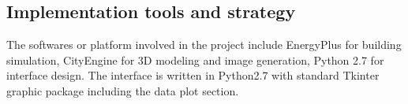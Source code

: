 \documentclass[hidelinks,12pt]{article}
\begin{document}
\subsection {Implementation tools and strategy}
The softwares or platform involved in the project include EnergyPlus
for building simulation, CityEngine for 3D modeling and image
generation, Python 2.7 for interface design. The interface is written
in Python2.7 with standard Tkinter graphic package including the data
plot section.
\begin{comment}
\item Conclusion
  \begin{enumerate}[label*=\arabic*.]
  \item Summary of the current approach in implementing the dynamic
    Energy Map
  \item Limitations of the current implementation
    \begin{enumerate}[label*=\arabic*.]
    \item Simplified building simulation assumption about urban
      environment
    \item Lack of user choices for the stand-alone user interface as a
      result of its dependence on existing modeling softwares
    \end{enumerate}
  \item Future Expansion of the project
    \begin{enumerate}[label*=\arabic*.]
    \item Adding information of the supply side: residual energy,
      sustainable energy
    \item Providing different interfaces for different user population
    \item 2D and 3D compatible \\The reason for providing 2D map
      together with 3D map is that 2D maps have the following good
      properties:
      \begin{enumerate}[label*=\arabic*.]
      \item Better for region selection and spatial navigation than 3D
        map
      \item Better for conveying spatial relationship that does not
        involve height induced variation
      \item For larger scale display of city, state or nationwide, 3D
        building geometries becomes less significant in providing the
        urban environment context
      \end{enumerate}
    \item Creating an on-line tool for better information share
      \begin{enumerate}[label*=\arabic*.]
      \item Potential techniques: see 2.4
      \end{enumerate}
    \end{enumerate}
  \end{enumerate}
\item Acknowledgments
\end{enumerate}
\end{comment}
\newpage


\end{document}
